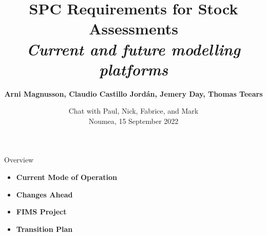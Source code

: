 \documentclass[aspectratio=169]{beamer}
\begin{document}
\begin{frame}
  \title{\vspace{-5ex}\darkblue SPC Requirements for Stock Assessments\\[2ex]
    \it\large\darkgray Current and future modelling platforms}
  \author{\vspace{-10ex}\darkgray\bf
    Arni Magnusson, Claudio Castillo Jordán, Jemery Day, Thomas Teears}
  \date{\darkgreen Chat with Paul, Nick, Fabrice, and Mark\\[0.5ex]
    Noumea, 15 September 2022}
  \titlepage
\end{frame}


\begin{frame}{Overview}
  \begin{itemize}
    \item[] {\bf\darkblue Current Mode of Operation} \\[5ex]
    \item[] {\bf\darkblue Changes Ahead} \\[5ex]
    \item[] {\bf\darkblue FIMS Project} \\[5ex]
    \item[] {\bf\darkblue Transition Plan} \\[1ex]
  \end{itemize}
\end{frame}

\end{document}
